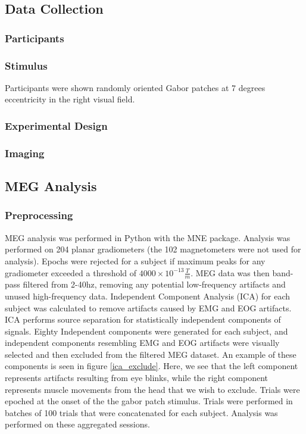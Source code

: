 \documentclass[../main.tex]{subfiles}
\begin{document}
\subsection{Data Collection}
\subsubsection{Participants}

\subsubsection{Stimulus}
Participants were shown randomly oriented Gabor patches at 7 degrees eccentricity in the right visual field.

\subsubsection{Experimental Design}

\subsubsection{Imaging}

\subsection{MEG Analysis}
\subsubsection{Preprocessing}
MEG analysis was performed in Python with the MNE package. Analysis was performed on 204 planar gradiometers (the 102 magnetometers were not used for analysis). Epochs were rejected for a subject if maximum peaks for any gradiometer exceeded a threshold of $4000\times10^{-13}  \frac{T}{m}$. MEG data was then band-pass filtered from 2-40hz, removing any potential low-frequency artifacts and unused high-frequency data. Independent Component Analysis (ICA) for each subject was calculated to remove artifacts caused by EMG and EOG artifacts. ICA performs source separation for statistically independent components of signals. Eighty Independent components were generated for each subject, and independent components resembling EMG and EOG artifacts were visually selected and then excluded from the filtered MEG dataset. An example of these components is seen in figure \ref{ica_exclude}. Here, we see that the left component represents artifacts resulting from eye blinks, while the right component represents muscle movements from the head that we wish to exclude. Trials were epoched at the onset of the the gabor patch stimulus. Trials were performed in batches of 100 trials that were concatenated for each subject. Analysis was performed on these aggregated sessions.
\end{document}
